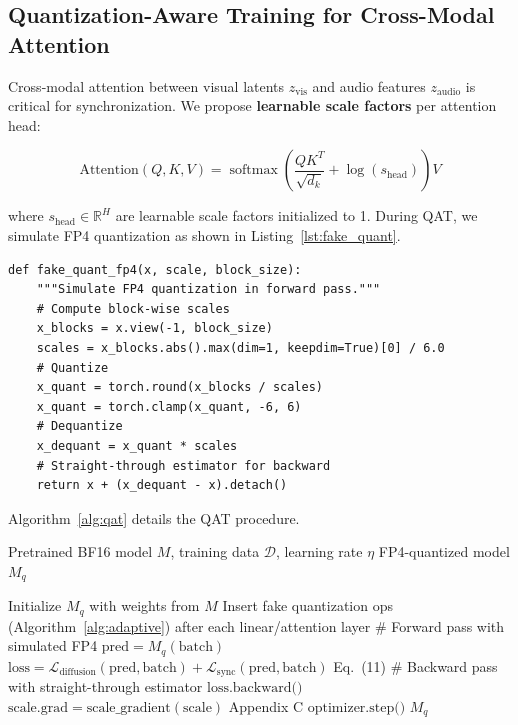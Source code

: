 \documentclass[journal]{IEEEtran}
\theoremstyle{definition}
\theoremstyle{remark}
\newcommand{\RR}{\mathbb{R}}
\DeclareMathOperator{\softmax}{softmax}
\begin{document}
\subsection{Quantization-Aware Training for Cross-Modal Attention}

Cross-modal attention between visual latents $z_{\text{vis}}$ and audio features $z_{\text{audio}}$ is critical for synchronization. We propose \textbf{learnable scale factors} per attention head:

\begin{equation}
\text{Attention}(Q, K, V) = \softmax\left( \frac{Q K^T}{\sqrt{d_k}} + \log(s_{\text{head}}) \right) V
\end{equation}

where $s_{\text{head}} \in \RR^{H}$ are learnable scale factors initialized to 1. During QAT, we simulate FP4 quantization as shown in Listing~\ref{lst:fake_quant}.

\begin{lstlisting}[caption={FP4 Fake Quantization with Straight-Through Estimator}, label={lst:fake_quant}]
def fake_quant_fp4(x, scale, block_size):
    """Simulate FP4 quantization in forward pass."""
    # Compute block-wise scales
    x_blocks = x.view(-1, block_size)
    scales = x_blocks.abs().max(dim=1, keepdim=True)[0] / 6.0
    # Quantize
    x_quant = torch.round(x_blocks / scales)
    x_quant = torch.clamp(x_quant, -6, 6)
    # Dequantize
    x_dequant = x_quant * scales
    # Straight-through estimator for backward
    return x + (x_dequant - x).detach()
\end{lstlisting}

Algorithm~\ref{alg:qat} details the QAT procedure.

\begin{algorithm}[t]
\caption{Quantization-Aware Training for NVFP4-DiT}
\label{alg:qat}
\begin{algorithmic}[1]
\REQUIRE Pretrained BF16 model $M$, training data $\mathcal{D}$, learning rate $\eta$
\ENSURE FP4-quantized model $M_q$

\STATE Initialize $M_q$ with weights from $M$
\STATE Insert fake quantization ops (Algorithm~\ref{alg:adaptive}) after each linear/attention layer
        \STATE \# Forward pass with simulated FP4
        \STATE $\text{pred} = M_q(\text{batch})$
        \STATE $\text{loss} = \mathcal{L}_{\text{diffusion}}(\text{pred}, \text{batch}) + \mathcal{L}_{\text{sync}}(\text{pred}, \text{batch})$ \hfill Eq.~(11)
        \STATE \# Backward pass with straight-through estimator
        \STATE $\text{loss.backward()}$
            \STATE $\text{scale.grad} = \text{scale\_gradient}(\text{scale})$ \hfill Appendix C
        \ENDFOR
        \STATE $\text{optimizer.step()}$
    \ENDFOR
\ENDFOR
\RETURN $M_q$
\end{algorithmic}
\end{algorithm}
\end{document}
